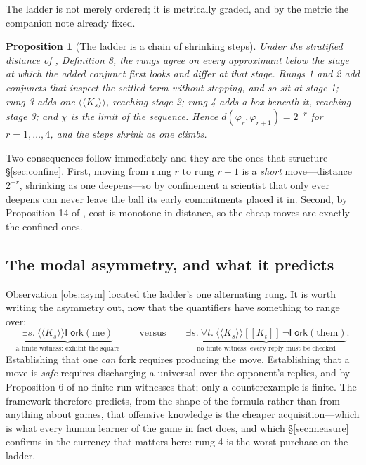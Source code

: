 \documentclass[11pt]{article}
\theoremstyle{definition}
\theoremstyle{plain}
\newtheorem{proposition}[definition]{Proposition}
\theoremstyle{remark}
\newcommand{\Frk}{\mathsf{Fork}}
\begin{document}
The ladder is not merely ordered; it is metrically graded, and by the metric the
companion note already fixed.

\begin{proposition}[The ladder is a chain of shrinking steps]
Under the stratified distance of \cite{scientist}, Definition 8, the rungs
agree on every approximant below the stage at which the added conjunct first
looks and differ at that stage. Rungs 1 and 2 add conjuncts that inspect the
settled term without stepping, and so sit at stage 1; rung 3 adds one
$\langle\!\langle K_s \rangle\!\rangle$, reaching stage 2; rung 4 adds a box
beneath it, reaching stage 3; and $\chi$ is the limit of the sequence. Hence
$d(\varphi_r,\varphi_{r+1}) = 2^{-r}$ for $r = 1, \dots, 4$, and the steps
shrink as one climbs.
\end{proposition}

Two consequences follow immediately and they are the ones that structure
\S\ref{sec:confine}. First, moving from rung $r$ to rung $r+1$ is a \emph{short}
move---distance $2^{-r}$, shrinking as one deepens---so by confinement a
scientist that only ever deepens can never leave the ball its early commitments
placed it in. Second, by Proposition 14 of \cite{scientist}, cost is monotone in
distance, so the cheap moves are exactly the confined ones.

\subsection{The modal asymmetry, and what it predicts}

Observation \ref{obs:asym} located the ladder's one alternating rung. It is
worth writing the asymmetry out, now that the quantifiers have something to
range over:
\[
\underbrace{\exists s.\ \langle\!\langle K_s\rangle\!\rangle \Frk(\text{me})}
_{\text{a finite witness: exhibit the square}}
\qquad\text{versus}\qquad
\underbrace{\exists s.\ \forall t.\ \langle\!\langle K_s\rangle\!\rangle
[\![K_t]\!]\,\neg\Frk(\text{them})}
_{\text{no finite witness: every reply must be checked}} .
\]
Establishing that one \emph{can} fork requires producing the move. Establishing
that a move is \emph{safe} requires discharging a universal over the opponent's
replies, and by Proposition 6 of \cite{scientist} no finite run witnesses that;
only a counterexample is finite. The framework therefore predicts, from the
shape of the formula rather than from anything about games, that offensive
knowledge is the cheaper acquisition---which is what every human learner of the
game in fact does, and which \S\ref{sec:measure} confirms in the currency that
matters here: rung 4 is the worst purchase on the ladder.
\end{document}
